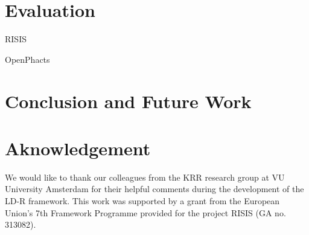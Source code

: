 \documentclass{acm_proc_article-sp}
\begin{document}
\section{Evaluation}

RISIS

OpenPhacts

\section{Conclusion and Future Work}

\section{Aknowledgement}
We would like to thank our colleagues from the KRR research group at VU University Amsterdam for their helpful comments during the development of the LD-R framework. This work was supported by a grant from the European Union’s 7th Framework Programme provided for the project RISIS (GA no. 313082).




\end{document}
